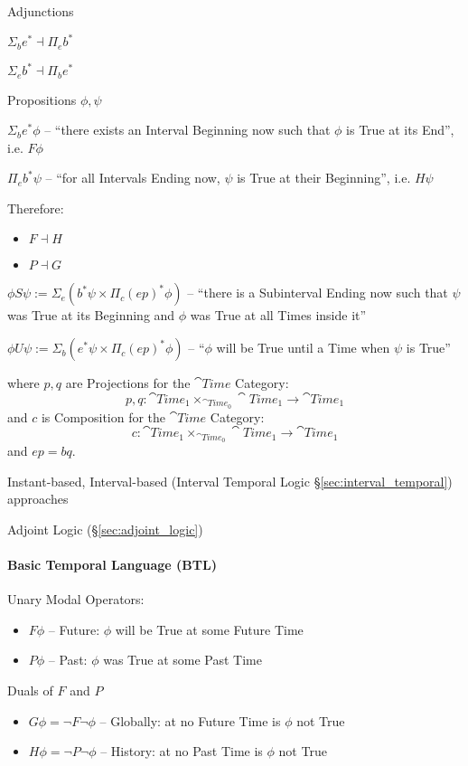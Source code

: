 Adjunctions

$\Sigma_b e^* \dashv \Pi_e b^*$

$\Sigma_e b^* \dashv \Pi_b e^*$

Propositions $\phi, \psi$

$\Sigma_b e^* \phi$ -- ``there exists an Interval Beginning now such
that $\phi$ is True at its End'', i.e. $F \phi$

$\Pi_e b^* \psi$ -- ``for all Intervals Ending now, $\psi$ is True at
their Beginning'', i.e. $H \psi$

Therefore:
\begin{itemize}
  \item $F \dashv H$
  \item $P \dashv G$
\end{itemize}

$\phi S \psi := \Sigma_e (b^* \psi \times \Pi_c(ep)^*\phi)$ -- ``there
is a Subinterval Ending now such that $\psi$ was True at its Beginning
and $\phi$ was True at all Times inside it''

$\phi U \psi := \Sigma_b (e^* \psi \times \Pi_c(ep)^*\phi)$ --
``$\phi$ will be True until a Time when $\psi$ is True''

where $p,q$ are Projections for the $\cat{Time}$ Category:
\[
  p,q : \cat{Time}_1 \times_{\cat{Time}_0} \cat{Time}_1
    \rightarrow \cat{Time}_1
\]
and $c$ is Composition for the $\cat{Time}$ Category:
\[
  c : \cat{Time}_1 \times_{\cat{Time}_0} \cat{Time}_1
    \rightarrow \cat{Time}_1
\]
and $ep = bq$.

Instant-based, Interval-based (Interval Temporal Logic
\S\ref{sec:interval_temporal}) approaches

Adjoint Logic (\S\ref{sec:adjoint_logic})



\paragraph{Basic Temporal Language (BTL)}\label{sec:btl}\hfill

Unary Modal Operators:
\begin{itemize}
  \item $F\phi$ -- Future: $\phi$ will be True at some Future Time
  \item $P\phi$ -- Past: $\phi$ was True at some Past Time
\end{itemize}

Duals of $F$ and $P$
\begin{itemize}
  \item $G\phi = \neg F \neg\phi$ -- Globally: at no Future Time is
    $\phi$ not True
  \item $H\phi = \neg P \neg\phi$ -- History: at no Past Time is
    $\phi$ not True
\end{itemize}


